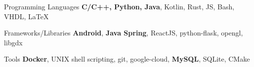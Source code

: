 

\begin{cvskills}

  \cvskill
    {Programming Languages} %
    {\textbf{C/C++, Python, Java}, Kotlin, Rust, JS, Bash, VHDL, \LaTeX} %

  \cvskill
    {Frameworks/Libraries} %
    {\textbf{Android}, \textbf{Java Spring}, ReactJS, python-flask, opengl, libgdx} %

  \cvskill
    {Tools} %
    {\textbf{Docker}, UNIX shell scripting, git, google-cloud, \textbf{MySQL}, SQLite, CMake} %

\end{cvskills}
